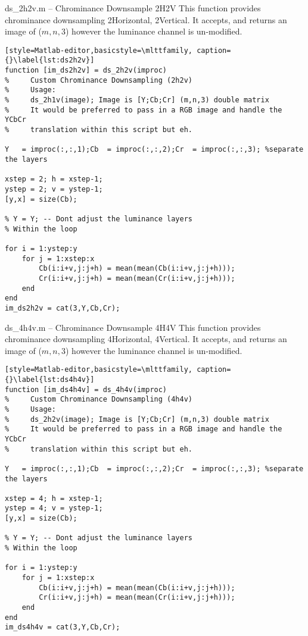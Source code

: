 \begin{codeblock}{ds\_2h2v.m -- Chrominance Downsample 2H2V}
    This function provides chrominance downsampling 2Horizontal, 2Vertical. It accepts, and returns an image of ($m,n,3$) however the luminance channel is un-modified.
        
    \begin{lstlisting}[style=Matlab-editor,basicstyle=\mlttfamily, caption={}\label{lst:ds2h2v}]
function [im_ds2h2v] = ds_2h2v(improc)
%     Custom Chrominance Downsampling (2h2v)
%     Usage:
%     ds_2h1v(image); Image is [Y;Cb;Cr] (m,n,3) double matrix
%     It would be preferred to pass in a RGB image and handle the YCbCr
%     translation within this script but eh.

Y   = improc(:,:,1);Cb  = improc(:,:,2);Cr  = improc(:,:,3); %separate the layers

xstep = 2; h = xstep-1;
ystep = 2; v = ystep-1;
[y,x] = size(Cb);

% Y = Y; -- Dont adjust the luminance layers
% Within the loop

for i = 1:ystep:y
    for j = 1:xstep:x
        Cb(i:i+v,j:j+h) = mean(mean(Cb(i:i+v,j:j+h)));
        Cr(i:i+v,j:j+h) = mean(mean(Cr(i:i+v,j:j+h)));
    end
end
im_ds2h2v = cat(3,Y,Cb,Cr);
    \end{lstlisting}
\end{codeblock}

\begin{codeblock}{ds\_4h4v.m -- Chrominance Downsample 4H4V}
    This function provides chrominance downsampling 4Horizontal, 4Vertical. It accepts, and returns an image of ($m,n,3$) however the luminance channel is un-modified.
        
    \begin{lstlisting}[style=Matlab-editor,basicstyle=\mlttfamily, caption={}\label{lst:ds4h4v}]
function [im_ds4h4v] = ds_4h4v(improc)
%     Custom Chrominance Downsampling (4h4v)
%     Usage:
%     ds_2h2v(image); Image is [Y;Cb;Cr] (m,n,3) double matrix
%     It would be preferred to pass in a RGB image and handle the YCbCr
%     translation within this script but eh.

Y   = improc(:,:,1);Cb  = improc(:,:,2);Cr  = improc(:,:,3); %separate the layers

xstep = 4; h = xstep-1;
ystep = 4; v = ystep-1;
[y,x] = size(Cb);

% Y = Y; -- Dont adjust the luminance layers
% Within the loop

for i = 1:ystep:y
    for j = 1:xstep:x
        Cb(i:i+v,j:j+h) = mean(mean(Cb(i:i+v,j:j+h)));
        Cr(i:i+v,j:j+h) = mean(mean(Cr(i:i+v,j:j+h)));
    end
end
im_ds4h4v = cat(3,Y,Cb,Cr);
    \end{lstlisting}
\end{codeblock}        
\clearpage

